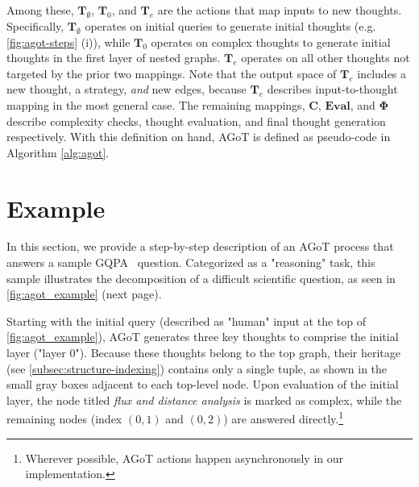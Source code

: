 \documentclass{article}
\begin{document}
Among these, $\mathbf{T}_\emptyset$, $\mathbf{T}_0$, and $\mathbf{T}_e$ are the actions that map inputs to new thoughts. Specifically, $\mathbf{T}_\emptyset$ operates on initial queries to generate initial thoughts (e.g. \autoref{fig:agot-steps} (i)), while $\mathbf{T}_0$ operates on complex thoughts to generate initial thoughts in the first layer of nested graphs. $\mathbf{T}_e$ operates on all other thoughts not targeted by the prior two mappings. Note that the output space of $\mathbf{T}_e$ includes a new thought, a strategy, \textit{and} new edges, because $\mathbf{T}_e$ describes input-to-thought mapping in the most general case. The remaining mappings, $\mathbf{C}$, $\mathbf{Eval}$, and $\mathbf{\Phi}$ describe complexity checks, thought evaluation, and final thought generation respectively. With this definition on hand, AGoT is defined as pseudo-code in Algorithm \ref{alg:agot}.

\section{Example} \label{sec:example}
In this section, we provide a step-by-step description of an AGoT process that answers a sample GQPA~\citep{rein2023gpqa} question. Categorized as a "reasoning" task, this sample illustrates the decomposition of a difficult scientific question, as seen in \autoref{fig:agot_example} (next page).

Starting with the initial query (described as "human" input at the top of \autoref{fig:agot_example}), AGoT generates three key thoughts to comprise the initial layer ("layer 0"). Because these thoughts belong to the top graph, their heritage (see \autoref{subsec:structure-indexing}) contains only a single tuple, as shown in the small gray boxes adjacent to each top-level node. Upon evaluation of the initial layer, the node titled \textit{flux and distance analysis} is marked as complex, while the remaining nodes (index $(0,1)$ and $(0,2)$) are answered directly.\footnote{Wherever possible, AGoT actions happen asynchronously in our implementation.}
\end{document}
